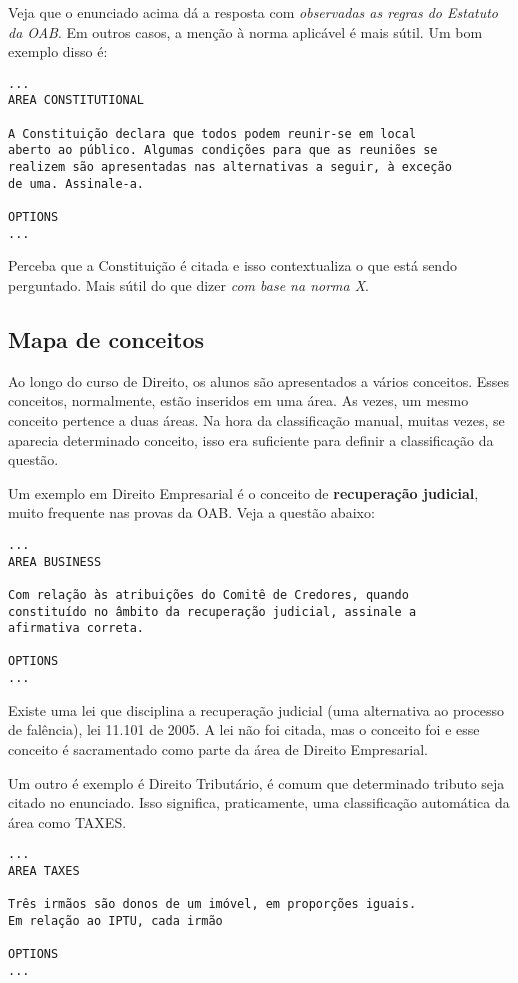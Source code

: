 \documentclass{article}
\begin{document}
Veja que o enunciado acima dá a resposta com \textit{observadas as
  regras do Estatuto da OAB}. Em outros casos, a menção à norma
aplicável é mais sútil. Um bom exemplo disso é:

\begin{verbatim}
...
AREA CONSTITUTIONAL

A Constituição declara que todos podem reunir-se em local 
aberto ao público. Algumas condições para que as reuniões se 
realizem são apresentadas nas alternativas a seguir, à exceção 
de uma. Assinale-a. 

OPTIONS
...
\end{verbatim}

Perceba que a Constituição é citada e isso contextualiza o que está
sendo perguntado. Mais sútil do que dizer \textit{com base na norma
  X}.

\subsection{Mapa de conceitos}\label{sec:mapa}

Ao longo do curso de Direito, os alunos são apresentados a vários
conceitos. Esses conceitos, normalmente, estão inseridos em uma
área. As vezes, um mesmo conceito pertence a duas áreas. Na hora da
classificação manual, muitas vezes, se aparecia determinado conceito,
isso era suficiente para definir a classificação da questão.

Um exemplo em Direito Empresarial é o conceito de \textbf{recuperação
  judicial}, muito frequente nas provas da OAB. Veja a questão abaixo:

\begin{verbatim}
...
AREA BUSINESS

Com relação às atribuições do Comitê de Credores, quando 
constituído no âmbito da recuperação judicial, assinale a 
afirmativa correta. 
 
OPTIONS
...
\end{verbatim}

Existe uma lei que disciplina a recuperação judicial (uma alternativa
ao processo de falência), lei 11.101 de 2005. A lei não foi citada,
mas o conceito foi e esse conceito é sacramentado como parte da área
de Direito Empresarial.

Um outro é exemplo é Direito Tributário, é comum que determinado
tributo seja citado no enunciado. Isso significa, praticamente, uma
classificação automática da área como TAXES.

\begin{verbatim}
...
AREA TAXES
 
Três irmãos são donos de um imóvel, em proporções iguais. 
Em relação ao IPTU, cada irmão 
 
OPTIONS
...
\end{verbatim}
\end{document}
